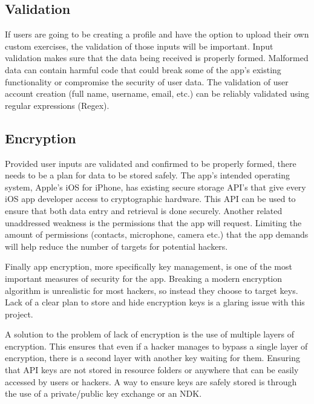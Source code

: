 \documentclass[10pt,twocolumn]{article}
\begin{document}
\subsection{Validation}
	

If users are going to be creating a profile and have the option to upload their own custom exercises, the validation of those inputs will be important. 
Input validation makes sure that the data being received is properly formed. 
Malformed data can contain harmful code that could break some of the app’s existing functionality or compromise the security of user data.
\cite{data_defense_7_nodate}
The validation of user account creation (full name, username, email, etc.) can be reliably validated using regular expressions (Regex).
\cite{data_defense_7_nodate}
 

\subsection{Encryption}
	Provided user inputs are validated and confirmed to be properly formed, there needs to be a plan for data to be stored safely. The app’s intended operating system, Apple’s iOS for iPhone, has existing secure storage API’s that give every iOS app developer access to cryptographic hardware. This API can be used to ensure that both data entry and retrieval is done securely. Another related unaddressed weakness is the permissions that the app will request. Limiting the amount of permissions (contacts, microphone, camera etc.) that the app demands will help reduce the number of targets for potential hackers. 
	\cite{data_defense_7_nodate}

	Finally app encryption, more specifically key management, is one of the most important measures of security for the app. Breaking a modern encryption algorithm is unrealistic for most hackers, so instead they choose to target keys. 
	\cite{data_defense_7_nodate} 
	Lack of a clear plan to store and hide encryption keys is a glaring issue with this project. 

	A solution to the problem of lack of encryption is the use of multiple layers of encryption. This ensures that even if a hacker manages to bypass a single layer of encryption, there is a second layer with another key waiting for them. Ensuring that API keys are not stored in resource folders or anywhere that can be easily accessed by users or hackers. A way to ensure keys are safely stored is through the use of a private/public key exchange or an NDK. 
	\cite{data_defense_7_nodate}
\end{document}
